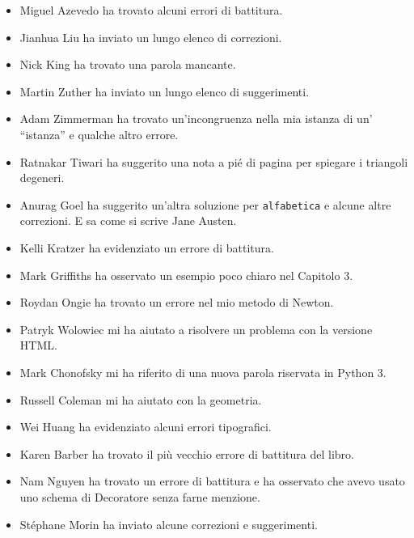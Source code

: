 \documentclass[10pt]{book}
\begin{document}
\begin{itemize}
\item Miguel Azevedo ha trovato alcuni errori di battitura.

\item Jianhua Liu ha inviato un lungo elenco di correzioni.

\item Nick King ha trovato una parola mancante.

\item Martin Zuther ha inviato un lungo elenco di suggerimenti.

\item Adam Zimmerman ha trovato un'incongruenza nella mia istanza di un' ``istanza'' e qualche altro errore.

\item Ratnakar Tiwari ha suggerito una nota a pié di pagina per spiegare i triangoli degeneri.

\item Anurag Goel ha suggerito un'altra soluzione per \verb"alfabetica"
e alcune altre correzioni. E sa come si scrive Jane Austen.

\item Kelli Kratzer ha evidenziato un errore di battitura.

\item Mark Griffiths ha osservato un esempio poco chiaro nel Capitolo 3.

\item Roydan Ongie ha trovato un errore nel mio metodo di Newton.

\item Patryk Wolowiec mi ha aiutato a risolvere un problema con la versione HTML.

\item Mark Chonofsky mi ha riferito di una nuova parola riservata in Python 3.

\item Russell Coleman mi ha aiutato con la geometria.

\item Wei Huang ha evidenziato alcuni errori tipografici.

\item Karen Barber ha trovato il più vecchio errore di battitura del libro.

\item Nam Nguyen ha trovato un errore di battitura e ha osservato che avevo usato uno schema di Decoratore senza farne menzione.

\item St\'{e}phane Morin ha inviato alcune correzioni e suggerimenti.


\end{itemize}
\end{document}
